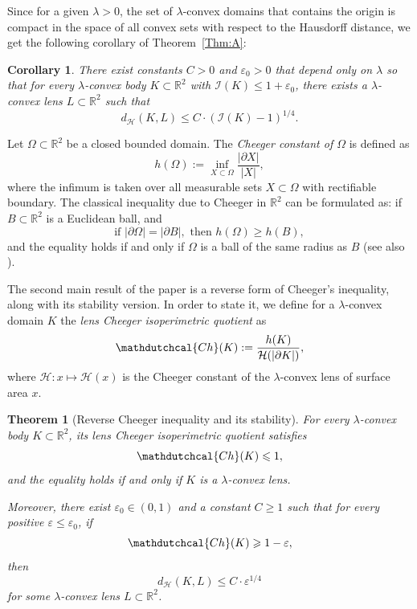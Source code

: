 \documentclass[11pt, oneside]{amsart}
\newcommand{\R}{\mathbb{R}}
\newcommand{\dH}{d_{\mathcal H}}
\newcommand{\Ll}{\mathcal{I}}
\newcommand{\Ch}{\mathdutchcal{Ch}}
\newcommand{\Hc}{\mathcal H}
\newcommand{\eps}{\varepsilon}
\renewcommand{\ge}{\geqslant}
\renewcommand{\le}{\leqslant}
\theoremstyle{theorem}
\newtheorem{corollary}[theorem]{Corollary}
\newtheorem{MainTheorem}{Theorem}
\theoremstyle{Intro}
\theoremstyle{definition}
\theoremstyle{remark}
\theoremstyle{claim}
\numberwithin{equation}{section}
\begin{document}
Since for a given $\lambda>0$, the set of $\lambda$-convex domains that contains the origin is compact in the space of all convex sets with respect to the Hausdorff distance, we get the following corollary of Theorem~\ref{Thm:A}:

\begin{corollary}
There exist constants $C>0$ and $\eps_0 > 0$ that depend only on $\lambda$ so that for every $\lambda$-convex body $K \subset \mathbb R^2$ with $\Ll(K) \le 1+\eps_0$, there exists a $\lambda$-convex lens $L \subset \mathbb R^2$ such that
\[
\dH(K, L) \le C \cdot \left(\mathcal I(K) - 1\right)^{{1}/{4}}. 
\]
\end{corollary}



Let $\Omega \subset \R^2$ be a closed bounded domain. The \emph{Cheeger constant of $\Omega$} is defined as
\[
h(\Omega) := \inf \limits_{X \subset \Omega} \frac{|\partial X|}{|X|},
\]
where the infimum is taken over all measurable sets $X \subset \Omega$ with rectifiable boundary. The classical inequality due to Cheeger \cite{C} in $\R^2$ can be formulated as: if $B \subset \R^2$ is a Euclidean ball, and 
\[
\text{if }|\partial \Omega| = |\partial B|, \text{ then } h(\Omega) \ge h(B), 
\]
and the equality holds if and only if $\Omega$ is a ball of the same radius as $B$ (see also \cite{Pa}). 

The second main result of the paper is a reverse form of Cheeger's inequality, along with its stability version. In order to state it, we define for a $\lambda$-convex domain $K$ the \emph{lens Cheeger isoperimetric quotient} as
\[
\Ch(K) := \frac{h(K)}{\Hc(|\partial K|)}, 
\]
where $\Hc \colon x \mapsto \Hc(x)$ is the Cheeger constant of the $\lambda$-convex lens of surface area $x$.

\begin{MainTheorem}[Reverse Cheeger inequality and its stability]
\label{Thm:C}
    For every $\lambda$-convex body $K \subset \R^2$, its lens Cheeger isoperimetric quotient satisfies
    \[
    \Ch(K) \le 1,
    \]
    and the equality holds if and only if $K$ is a $\lambda$-convex lens. 
    
    Moreover, there exist $\eps_0 \in (0,1)$ and a constant $C \ge 1$ such that for every positive $\eps \le \eps_0$, if
    \[
    \Ch(K) \ge 1 - \eps,
    \]
    then 
    \[
    \dH(K,L) \le C \cdot \eps^{{1}/{4}}
    \]    
    for some $\lambda$-convex lens $L \subset \R^2$.
\end{MainTheorem}
\end{document}
